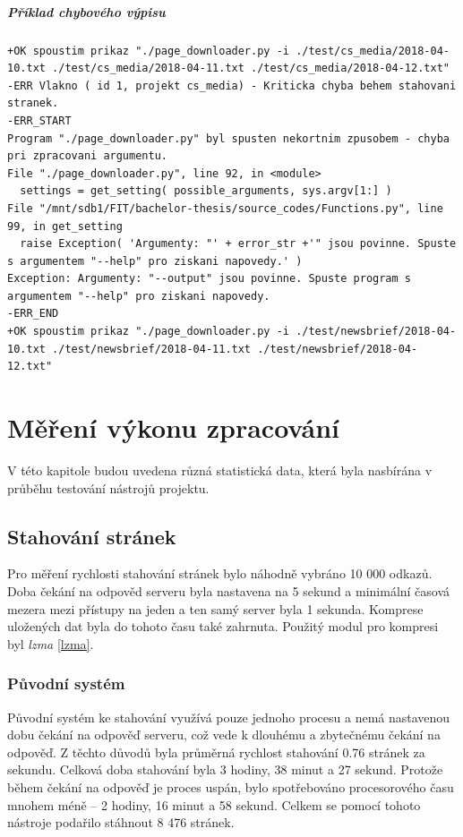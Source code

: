 \paragraph{Příklad chybového výpisu}
\begin{lstlisting}
+OK spoustim prikaz "./page_downloader.py -i ./test/cs_media/2018-04-10.txt ./test/cs_media/2018-04-11.txt ./test/cs_media/2018-04-12.txt"
-ERR Vlakno ( id 1, projekt cs_media) - Kriticka chyba behem stahovani stranek.
-ERR_START
Program "./page_downloader.py" byl spusten nekortnim zpusobem - chyba pri zpracovani argumentu.
File "./page_downloader.py", line 92, in <module>
  settings = get_setting( possible_arguments, sys.argv[1:] )
File "/mnt/sdb1/FIT/bachelor-thesis/source_codes/Functions.py", line 99, in get_setting
  raise Exception( 'Argumenty: "' + error_str +'" jsou povinne. Spuste s argumentem "--help" pro ziskani napovedy.' )
Exception: Argumenty: "--output" jsou povinne. Spuste program s argumentem "--help" pro ziskani napovedy.
-ERR_END
+OK spoustim prikaz "./page_downloader.py -i ./test/newsbrief/2018-04-10.txt ./test/newsbrief/2018-04-11.txt ./test/newsbrief/2018-04-12.txt"
\end{lstlisting}

\chapter{Měření výkonu zpracování}
V této kapitole budou uvedena různá statistická data, která byla nasbírána v průběhu
testování nástrojů projektu.

\section{Stahování stránek}
Pro měření rychlosti stahování stránek bylo náhodně vybráno 10 000 odkazů. Doba čekání
na odpověd serveru byla nastavena na 5 sekund a minimální časová mezera mezi přístupy
na jeden a ten samý server byla 1 sekunda. Komprese uložených dat byla do tohoto
času také zahrnuta. Použitý modul pro kompresi byl \textit{lzma} \ref{lzma}.

\subsection{Původní systém}
Původní systém ke stahování využívá pouze jednoho procesu a nemá nastavenou dobu
čekání na odpověď serveru, což vede k dlouhému a zbytečnému čekání na odpověď.
Z těchto důvodů byla průměrná rychlost stahování 0.76 stránek za sekundu. Celková doba
stahování byla 3 hodiny, 38 minut a 27 sekund. Protože během čekání na odpověď je
proces uspán, bylo spotřebováno procesorového času mnohem méně -- 2 hodiny, 16 minut a
58 sekund. Celkem se pomocí tohoto nástroje podařilo stáhnout 8 476 stránek.

